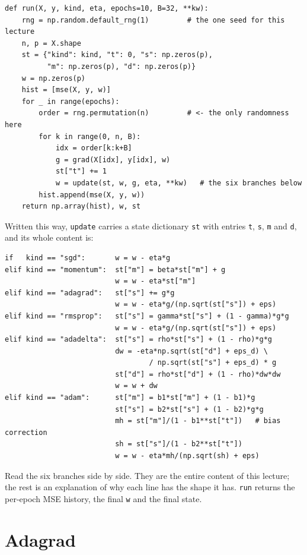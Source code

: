 \documentclass[11pt]{article}
\begin{document}
\begin{lstlisting}
def run(X, y, kind, eta, epochs=10, B=32, **kw):
    rng = np.random.default_rng(1)         # the one seed for this lecture
    n, p = X.shape
    st = {"kind": kind, "t": 0, "s": np.zeros(p),
          "m": np.zeros(p), "d": np.zeros(p)}
    w = np.zeros(p)
    hist = [mse(X, y, w)]
    for _ in range(epochs):
        order = rng.permutation(n)         # <- the only randomness here
        for k in range(0, n, B):
            idx = order[k:k+B]
            g = grad(X[idx], y[idx], w)
            st["t"] += 1
            w = update(st, w, g, eta, **kw)   # the six branches below
        hist.append(mse(X, y, w))
    return np.array(hist), w, st
\end{lstlisting}

Written this way, \texttt{update} carries a state dictionary \texttt{st} with
entries \texttt{t}, \texttt{s}, \texttt{m} and \texttt{d}, and its whole
content is:

\begin{lstlisting}
if   kind == "sgd":       w = w - eta*g
elif kind == "momentum":  st["m"] = beta*st["m"] + g
                          w = w - eta*st["m"]
elif kind == "adagrad":   st["s"] += g*g
                          w = w - eta*g/(np.sqrt(st["s"]) + eps)
elif kind == "rmsprop":   st["s"] = gamma*st["s"] + (1 - gamma)*g*g
                          w = w - eta*g/(np.sqrt(st["s"]) + eps)
elif kind == "adadelta":  st["s"] = rho*st["s"] + (1 - rho)*g*g
                          dw = -eta*np.sqrt(st["d"] + eps_d) \
                                  / np.sqrt(st["s"] + eps_d) * g
                          st["d"] = rho*st["d"] + (1 - rho)*dw*dw
                          w = w + dw
elif kind == "adam":      st["m"] = b1*st["m"] + (1 - b1)*g
                          st["s"] = b2*st["s"] + (1 - b2)*g*g
                          mh = st["m"]/(1 - b1**st["t"])   # bias correction
                          sh = st["s"]/(1 - b2**st["t"])
                          w = w - eta*mh/(np.sqrt(sh) + eps)
\end{lstlisting}

Read the six branches side by side. They are the entire content of this
lecture; the rest is an explanation of why each line has the shape it has.
\texttt{run} returns the per-epoch MSE history, the final \texttt{w} and the
final state.

\notesources{\AMLUnitIIISources}

\section{Adagrad}
\label{sec:adagrad}
\end{document}
